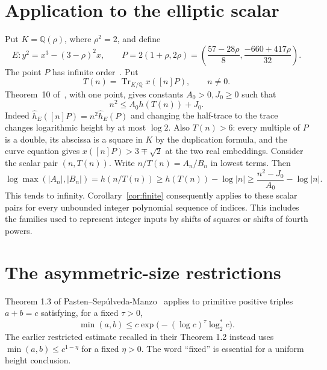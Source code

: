 \documentclass[11pt,a4paper]{article}
\newcommand{\Q}{\mathbb Q}\newcommand{\Z}{\mathbb Z}
\DeclareMathOperator{\Tr}{Tr}
\begin{document}
\section{Application to the elliptic scalar}

Put $K=\Q(\rho)$, where $\rho^2=2$, and define
\[
 E:y^2=x^3-(3-\rho)^2x,\qquad
 P=2(1+\rho,2\rho)
   =\left(\frac{57-28\rho}{8},\frac{-660+417\rho}{32}\right).
\]
The point $P$ has infinite order~\cite[Lemma 8]{Trace}. Put
\[
             T(n)=\Tr_{K/\Q}x([n]P),\qquad n\ne0.
\]
Theorem~10 of~\cite{Trace}, with one point, gives constants $A_0>0,J_0\ge0$
such that
\begin{equation}\label{eq:trace}
                     n^2\le A_0h(T(n))+J_0.
\end{equation}
Indeed $\widehat h_E([n]P)=n^2\widehat h_E(P)$ and changing the
half-trace to the trace changes logarithmic height by at most $\log2$.
Also $T(n)>6$: every multiple of $P$ is a double, its abscissa is a
square in $K$ by the duplication formula, and the curve equation
gives $x([n]P)>3\mp\sqrt2$ at the two real embeddings.
Consider the scalar pair $(n,T(n))$. Write
$n/T(n)=A_n/B_n$ in lowest terms. Then
\[
 \log\max(|A_n|,|B_n|)=h(n/T(n))
 \ge h(T(n))-\log|n|
 \ge\frac{n^2-J_0}{A_0}-\log|n|.
\]
This tends to infinity. Corollary~\ref{cor:finite} consequently
applies to these scalar pairs for every unbounded integer polynomial
sequence of indices. This includes the families used to represent
integer inputs by shifts of squares or shifts of fourth powers.

\section{The asymmetric-size restrictions}

Theorem 1.3 of Pasten--Sep\'ulveda-Manzo~\cite{PastenSepulveda} applies
to primitive positive triples $a+b=c$ satisfying, for a fixed $\tau>0$,
\begin{equation}\label{eq:asymmetric}
 \min(a,b)\le c\exp\bigl(- (\log c)^\tau\log_2^*c\bigr).
\end{equation}
The earlier restricted estimate recalled in their Theorem 1.2 instead
uses $\min(a,b)\le c^{1-\eta}$ for a fixed $\eta>0$.
The word ``fixed'' is essential for a uniform height conclusion.
\end{document}
